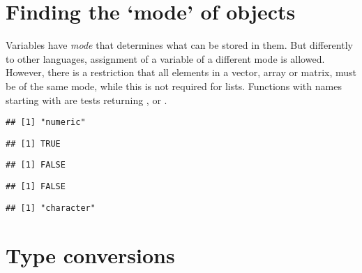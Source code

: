 \documentclass[paper=a4,10pt,div=17,headsepline,BCOR=12mm,twoside,open=right]{scrbook}\usepackage{knitr}
\begin{document}
\section{Finding the `mode' of objects}

Variables have \emph{mode} that determines what can be stored in them. But differently to other languages, assignment of a variable of a different mode is allowed. However, there is a restriction that all elements in a vector, array or matrix, must be of the same mode, while this is not required for lists. Functions with names starting with  are tests returning ,  or .

\begin{knitrout}\footnotesize
{}\color{fgcolor}\begin{kframe}
\begin{alltt}
 \hlkwb{<-} \hlopt{:}
\end{alltt}
\begin{verbatim}
## [1] "numeric"
\end{verbatim}
\begin{alltt}
\end{alltt}
\begin{verbatim}
## [1] TRUE
\end{verbatim}
\begin{alltt}
\end{alltt}
\begin{verbatim}
## [1] FALSE
\end{verbatim}
\begin{alltt}
\end{alltt}
\begin{verbatim}
## [1] FALSE
\end{verbatim}
\begin{alltt}
 \hlkwb{<-} 
\end{alltt}
\begin{verbatim}
## [1] "character"
\end{verbatim}
\end{kframe}
\end{knitrout}

\section{Type conversions}
\end{document}
